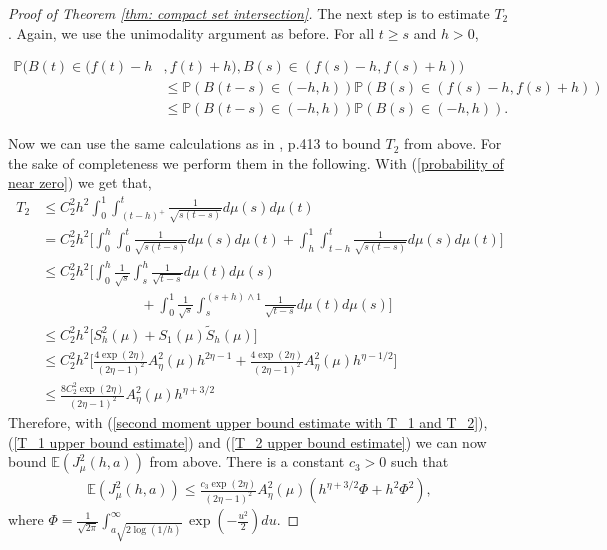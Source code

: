 \documentclass[11pt, reqno]{amsart}
\theoremstyle{plain}
\theoremstyle{definition}
\theoremstyle{remark}
\begin{document}
\begin{proof}[Proof of Theorem \ref{thm: compact set intersection}]
The next step is to estimate $T_2$. Again, we use the unimodality argument as before. For all $t\geq s$ and $h>0$,

\begin{align*}
{\mathbb{P}} ( B(t) \in  (f(t)-h  &, f(t)+h)  , B(s) \in (f(s)-h, f(s)+h) ) \\
&\leq {\mathbb{P}} ( B(t-s) \in (-h, h)) {\mathbb{P}} ( B(s) \in (f(s)-h, f(s)+h))\\
&\leq {\mathbb{P}} ( B(t-s) \in (-h, h)) {\mathbb{P}} ( B(s) \in (-h, h)).
\end{align*}

Now we can use the same calculations as in \cite{KS}, p.413 to bound $T_2$ from above. For the sake of completeness we perform them in the following. With (\ref{probability of near zero}) we get that,
\begin{align}\label{T_2 upper bound estimate}
T_2 &\leq C^2_2 h^2  \int_0^{1}  \int_{(t-h)^+}^{t} \frac{1}{\sqrt{s(t-s)}} d\mu(s)d\mu(t) \nonumber \\ \nonumber
&= C^2_2 h^2\Big[ \int_0^{h} \int_{0}^{t} \frac{1}{\sqrt{s(t-s)}} d\mu(s)d\mu(t)
+ \int_h^{1} \int_{t-h}^{t} \frac{1}{\sqrt{s(t-s)}} d\mu(s)d\mu(t)\Big]\\ \nonumber
&\leq C^2_2 h^2\Big[ \int_0^{h}  \frac{1}{\sqrt{s}}  \int_{s}^{h} \frac{1}{\sqrt{t-s}} d\mu(t) d\mu(s)   \\ \nonumber
& \ \ \ \ \ \ \ \ \ \ \ \ \ \ \ \ \ \ \ \ \ \ \ \ \ \ \ \ \ \ \ \ + \int_0^{1} \frac{1}{\sqrt{s}} \int_{s}^{(s+h)\wedge 1} \frac{1}{\sqrt{t-s}} d\mu(t) d\mu(s) \Big]\\ \nonumber
&\leq C^2_2 h^2\Big[ S_h^2(\mu) + S_1(\mu)\tilde{S}_h(\mu) \Big] \\ \nonumber
&\leq C^2_2 h^2\Big[ \frac{4 \exp{(2\eta)}}{(2\eta-1)^2} A_\eta^2(\mu) h^{2\eta -1} + \frac{4 \exp{(2\eta)}}{(2\eta-1)^2} A_\eta^2(\mu) h^{\eta -1/2} \Big]\\
&\leq \frac{8C^2_2 \exp{(2\eta)}}{(2\eta-1)^2} A_\eta^2(\mu) h^{\eta +3/2}
\end{align}
Therefore, with (\ref{second moment upper bound estimate with T_1 and T_2}), (\ref{T_1 upper bound estimate}) and (\ref{T_2 upper bound estimate}) we can now bound ${\mathbb{E}} (J^2_{\mu}(h,a))$ from above. There is a constant $c_3>0$ such that
\begin{align}\label{secondmoment_fasttime}
{\mathbb{E}} (J^2_{\mu}(h,a)) \leq \frac{c_3 \exp{(2\eta)}}{(2\eta-1)^2} A_\eta^2(\mu) (h^{\eta +3/2}\Phi +h^2\Phi ^2),
\end{align}
where $\Phi = \frac{1}{\sqrt{2\pi}}\int_{a\sqrt{2\log(1/h)}}^\infty \exp(-\frac{u^2}{2}) du $.


\end{proof}
\end{document}

